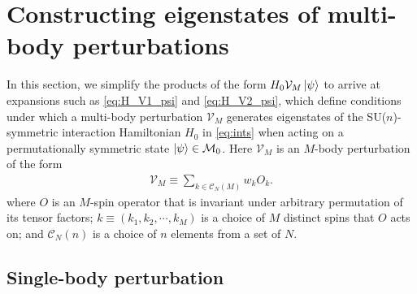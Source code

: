 \documentclass[nofootinbib,notitlepage,11pt]{revtex4-2}
\newcommand{\p}[1]{\left(#1\right)} %
\newcommand{\1}{\mathds{1}}
\newcommand{\C}{\mathcal{C}}
\newcommand{\M}{\mathcal{M}}
\newcommand{\V}{\mathcal{V}}
\begin{document}
\section{Constructing eigenstates of multi-body perturbations}
\label{sec:H_VM_psi}

In this section, we simplify the products of the form
$H_0\V_M\ket\psi$ to arrive at expansions such as \eqref{eq:H_V1_psi}
and \eqref{eq:H_V2_psi}, which define conditions under which a
multi-body perturbation $\V_M$ generates eigenstates of the
SU($n$)-symmetric interaction Hamiltonian $H_0$ in \eqref{eq:ints}
when acting on a permutationally symmetric state $\ket\psi\in\M_0$.
Here $\V_M$ is an $M$-body perturbation of the form
\begin{align}
  \V_M \equiv \sum_{k\in\C_N\p{M}} w_k O_k.
\end{align}
where $O$ is an $M$-spin operator that is invariant under arbitrary
permutation of its tensor factors; $k\equiv\p{k_1,k_2,\cdots,k_M}$ is
a choice of $M$ distinct spins that $O$ acts on; and $\C_N\p{n}$ is a
choice of $n$ elements from a set of $N$.

\subsection{Single-body perturbation}
\label{sec:H_V1_psi}
\end{document}

